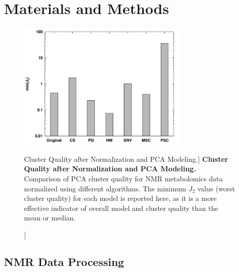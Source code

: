 \section{Materials and Methods}

\begin{figure}
\includegraphics[width=3.25in]{figs/pscorr/01-minj2.png}
\caption
      [Cluster Quality after Normalization and PCA Modeling.]{
  {\bf Cluster Quality after Normalization and PCA Modeling.}
  \\
  Comparison of PCA cluster quality for \hnmr{} NMR metabolomics data
  normalized using different algorithms. The minimum $J_2$ value (worst
  cluster quality) for each model is reported here, as it is a more effective
  indicator of overall model and cluster quality than the mean or median.
}
\label{figure.6.1}
\end{figure}

\subsection{NMR Data Processing}

